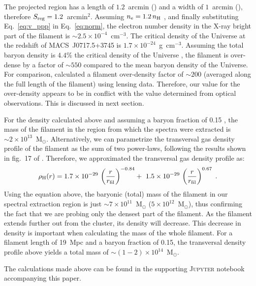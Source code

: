 The projected region has a length of $1.2$~arcmin () and a width of $1$~arcmin (), therefore $S_{\rm reg} = 1.2$~arcmin$^{2}$. Assuming $n_{\rm e} = 1.2\, n_{\rm H}$ \citep[e.g.,][]{Bohringer2010}, and finally substituting Eq.~\ref{eq:v_ppp} in Eq.~\ref{eq:norm}, the electron number density in the X-ray bright part of the filament is $\sim 2.5\times 10^{-4}$~cm$^{-3}$. The critical density of the Universe at the redshift of MACS~J0717.5+3745 is $1.7\times 10^{-24}$~g~cm$^{-3}$. Assuming the total baryon density is $4.4\%$ the critical density of the Universe \citep{Kirkman2003}, the filament is over-dense by a factor of $\sim 550$ compared to the mean baryon density of the Universe. For comparison, \citet{Jauzac2012} calculated a filament over-density factor of $\sim 200$ (averaged along the full length of the filament) using lensing data. Therefore, our value for the over-density appears to be in conflict with the value determined from optical observations. This is discussed in next section.

For the density calculated above and assuming a baryon fraction of 0.15 \citep{Mantz2014}, the mass of the filament in the region from which the spectra were extracted is $\sim 2\times 10^{13}$~M$_\odot$. Alternatively, we can parametrize the transversal gas density profile of the filament as the sum of two power-laws, following the results shown in fig.~17 of \citet{Gheller2015}. Therefore, we approximated the transversal gas density profile as:
\begin{equation}
	\rho_{\rm H}(r) = 1.7 \times 10^{-29} \, \left(\frac{r}{r_{\rm fil}}\right)^{-0.84} + \
	                             1.5 \times 10^{-29} \, \left(\frac{r}{r_{\rm fil}}\right)^{0.67}  \;. \nonumber
\end{equation}
Using the equation above, the baryonic (total) mass of the filament in our spectral extraction region is just $\sim 7\times 10^{11}$~M$_\odot$ ($5\times 10^{12}$~M$_\odot$), thus confirming the fact that we are probing only the densest part of the filament. As the filament extends further out from the cluster, its density will decrease. This decrease in density is important when calculating the mass of the whole filament. For a filament length of 19~Mpc and a baryon fraction of 0.15, the transversal density profile above yields a total mass of $\sim (1-2)\times 10^{14}$~M$_\odot$. 

The calculations made above can be found in the supporting \textsc{Jupyter} notebook accompanying this paper.  





